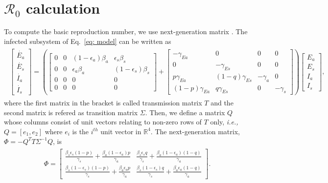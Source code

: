 \documentclass[a4paper,12pt]{article}
\begin{document}
\section{$\mathcal{R}_{0}$ calculation}
To compute the basic reproduction number, we use next-generation matrix \cite{diekmann2010construction}. The infected subsystem of Eq.~\ref{eq: model} can be written as
\begin{align}\label{eq: infect - submodel}
\begin{split}
\begin{bmatrix} 
\dot{E_{a}}\\
\dot{E_{s}} \\
\dot{I_{a}} \\
\dot{I_{s}}
\end{bmatrix}
 = 
\left(  \begin{bmatrix} 
 0 & 0 & (1 - \epsilon_{a})\beta_{a} & \epsilon_{s}\beta_{s}\\
 0 & 0 & \epsilon_{a}\beta_{a} & (1 - \epsilon_{s})\beta_{s}\\
 0 & 0 & 0 & 0\\
 0 & 0 & 0 & 0
 \end{bmatrix}
 +
 \begin{bmatrix} 
 -\gamma_{Ea} & 0 & 0 & 0\\
0 & -\gamma_{Es} & 0 & 0\\
 p\gamma_{Ea} & (1 - q)\gamma_{Es} & -\gamma_{a}& 0\\
 (1 - p)\gamma_{Ea} & q\gamma_{Es} & 0 & -\gamma_{s}
 \end{bmatrix}
 \right)
 \begin{bmatrix} 
 E_{a}\\
 E_{s} \\
 I_{a}\\
 I_{s}
 \end{bmatrix},
\end{split}
\end{align}
where the first matrix in the bracket is called transmission matrix $T$ and the second matrix is refered as transition matrix $\Sigma$. Then, we define a matrix $Q$  whose columns consist of unit vectors relating
to non-zero rows of $T$ only, \emph{i.e.,} $Q = [e_{1}, e_{2}]$ where $e_{i}$ is the $i^{th}$ unit vector in $\mathbb{R}^{4}$. The next-generation matrix, $\Phi = -Q^{T}T\Sigma^{-1}Q$, is
\begin{align}\label{eq: ngm}
\begin{split}
\Phi = \begin{bmatrix} 
\frac{\beta_{s}\epsilon_{s}(1 - p)}{\gamma_{s}} + \frac{\beta_{a}(1 - \epsilon_{a})p}{\gamma_{a}} &
\frac{\beta_{s}\epsilon_{s}q}{\gamma_{s}} + \frac{\beta_{a}(1 - \epsilon_{a})(1 - q)}{\gamma_{a}} \\
\frac{\beta_{s}(1 - \epsilon_{s})(1 - p)}{\gamma_{s}} + \frac{\beta_{a}\epsilon_{a}p}{\gamma_{a}} &
\frac{\beta_{s}(1 - \epsilon_{s})q}{\gamma_{s}} + \frac{\beta_{a}\epsilon_{a}(1 - q)}{\gamma_{a}} 
\end{bmatrix}.
\end{split}
\end{align}
\end{document}
